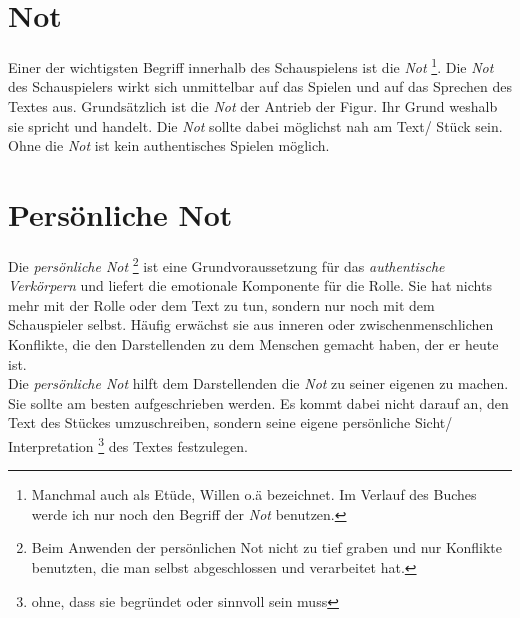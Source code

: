 \documentclass[ngerman, a4paper, twoside]{scrbook}%
\begin{document}
	\section{Not}
	Einer der wichtigsten Begriff innerhalb des Schauspielens ist die \emph{Not} \footnote{Manchmal auch als Etüde, Willen o.ä bezeichnet. Im Verlauf des Buches werde ich nur noch den Begriff der \emph{Not} benutzen.}. Die \emph{Not} des Schauspielers wirkt sich unmittelbar auf das Spielen und auf das Sprechen des Textes aus. Grundsätzlich ist die \emph{Not} der Antrieb der Figur. Ihr Grund weshalb sie spricht und handelt. Die \emph{Not} sollte dabei möglichst nah am Text/ Stück  sein. Ohne die \emph{Not} ist kein authentisches Spielen möglich.

	\section{Persönliche Not}
	Die \emph{persönliche Not}
	\footnote{Beim Anwenden der persönlichen Not nicht zu tief graben und nur Konflikte benutzten, die man selbst abgeschlossen und verarbeitet hat.}
	ist eine Grundvoraussetzung für das \emph{authentische Verkörpern} und liefert die emotionale Komponente für die Rolle.  Sie hat nichts mehr mit der Rolle oder dem Text zu tun, sondern nur noch mit dem Schauspieler selbst. Häufig erwächst sie aus inneren oder zwischenmenschlichen Konflikte, die  den Darstellenden zu dem Menschen gemacht haben, der er heute ist. \\
	Die \emph{persönliche Not} hilft dem Darstellenden die \emph{Not} zu seiner eigenen zu machen. Sie sollte am besten aufgeschrieben werden. Es kommt dabei nicht darauf an, den Text des Stückes umzuschreiben, sondern seine eigene persönliche Sicht/ Interpretation
	\footnote{ohne, dass sie begründet oder sinnvoll sein muss}
	 des Textes festzulegen.
	 \vfill
\end{document}
